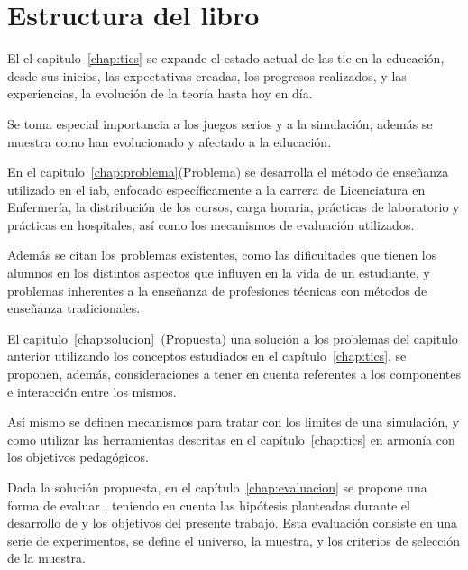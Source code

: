 \section{Estructura del libro}


El el capitulo~\ref{chap:tics} se expande el estado actual de las \Gls{tic} en
la educación, desde sus inicios, las expectativas creadas, los progresos
realizados, y las experiencias, la evolución de la teoría hasta hoy en día.

Se toma especial importancia a los juegos serios y a la simulación, además se
muestra como han evolucionado y afectado a la educación.


En el capitulo~\ref{chap:problema}(Problema) se desarrolla el método de
enseñanza utilizado en el \Gls{iab}, enfocado específicamente a la carrera de
Licenciatura en Enfermería, la distribución de los cursos, carga horaria,
prácticas de laboratorio y prácticas en hospitales, así como los mecanismos de
evaluación utilizados.

Además se citan los problemas existentes, como las dificultades que tienen los
alumnos en los distintos aspectos que influyen en la vida de un estudiante, y
problemas inherentes a la enseñanza de profesiones técnicas con métodos de
enseñanza tradicionales.


El capitulo~\ref{chap:solucion}~(Propuesta)  una
solución a los problemas del capitulo anterior utilizando los conceptos
estudiados en el capítulo~\ref{chap:tics}, se proponen, además, consideraciones
a tener en cuenta referentes a los componentes e interacción entre los mismos.

Así mismo se definen mecanismos para tratar con los limites de una simulación, y
como utilizar las herramientas descritas en el capítulo~\ref{chap:tics} en
armonía con los objetivos pedagógicos.


Dada la solución propuesta, en el capítulo~\ref{chap:evaluacion} se propone una
forma de evaluar , teniendo en cuenta las hipótesis
planteadas durante el desarrollo de  y los objetivos
del presente trabajo. Esta evaluación consiste en una serie de experimentos, se
define el universo, la muestra, y los criterios de selección de la muestra.

